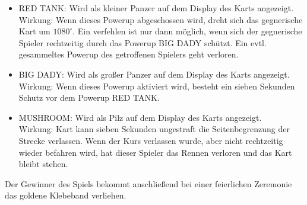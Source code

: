 \begin{itemize}
	\item RED TANK: Wird als kleiner Panzer auf dem Display des Karts angezeigt.\\Wirkung: Wenn dieses Powerup abgeschossen wird, dreht sich das gegnerische Kart um $1080^\circ$. Ein verfehlen ist nur dann möglich, wenn sich der gegnerische Spieler rechtzeitig durch das Powerup BIG DADY schützt. Ein evtl. gesammeltes Powerup des getroffenen Spielers geht verloren.
	\item BIG DADY: Wird als großer Panzer auf dem Display des Karts angezeigt.
	\\Wirkung: Wenn dieses Powerup aktiviert wird, besteht ein sieben Sekunden Schutz vor  
	dem Powerup RED TANK. 
	\item MUSHROOM: Wird als Pilz auf dem Display des Karts angezeigt. 
	\\Wirkung: Kart kann sieben Sekunden ungestraft die Seitenbegrenzung der Strecke verlassen. 		
	Wenn der Kurs verlassen wurde, aber nicht rechtzeitig wieder befahren wird, hat dieser 	
	Spieler das Rennen verloren und das Kart bleibt stehen.
\end{itemize}

Der Gewinner des Spiels bekommt anschließend bei einer feierlichen Zeremonie das goldene Klebeband verliehen. 


 



































